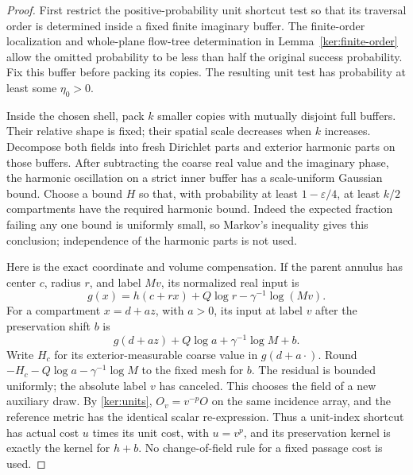 \begin{proof}
First restrict the positive-probability unit shortcut test so that its
traversal order is determined inside a fixed finite imaginary buffer.
The finite-order localization and whole-plane flow-tree determination
in Lemma~\ref{ker:finite-order} allow the omitted probability to be
less than half the original success probability.  Fix this buffer
before packing its copies.  The resulting unit test has probability
at least some $\eta_0>0$.

Inside the chosen shell, pack $k$ smaller copies with mutually
disjoint full buffers.  Their relative shape is fixed; their spatial
scale decreases when $k$ increases.  Decompose both fields into fresh
Dirichlet parts and exterior harmonic parts on those buffers.  After
subtracting the coarse real value and the imaginary phase, the
harmonic oscillation on a strict inner buffer has a scale-uniform
Gaussian bound.  Choose a bound $H$ so that, with probability at least
$1-\varepsilon/4$, at least $k/2$ compartments have the required
harmonic bound.  Indeed the expected fraction failing any one bound
is uniformly small, so Markov's inequality gives this conclusion;
independence of the harmonic parts is not used.

Here is the exact coordinate and volume compensation.  If the parent
annulus has center $c$, radius $r$, and label $Mv$, its normalized
real input is
\[
 g(x)=h(c+rx)+Q\log r-\gamma^{-1}\log(Mv).
\]
For a compartment $x=d+az$, with $a>0$, its input at label $v$
after the preservation shift $b$ is
\begin{equation}\label{met:compartment-input}
 g(d+az)+Q\log a+\gamma^{-1}\log M+b.
\end{equation}
Write $H_c$ for its exterior-measurable coarse value in $g(d+a\cdot)$.
Round $-H_c-Q\log a-\gamma^{-1}\log M$ to the fixed mesh for $b$.
The residual is bounded uniformly; the absolute label $v$ has
canceled.  This chooses the field of a new auxiliary draw.
By \eqref{ker:units}, $O_v=v^{-p}O$ on the same incidence array,
and the reference metric has the identical scalar re-expression.
Thus a unit-index shortcut has actual cost $u$ times its unit cost,
with $u=v^p$, and its preservation kernel is exactly the kernel for
$h+b$.  No change-of-field rule for a fixed passage cost is used.


\end{proof}

